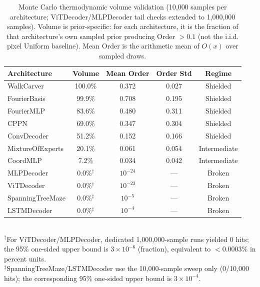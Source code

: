 \documentclass{article}
\begin{document}
\begin{table}[H]
\centering
\caption{Monte Carlo thermodynamic volume validation (10,000 samples per architecture; ViTDecoder/MLPDecoder tail checks extended to 1,000,000 samples). Volume is prior-specific: for each architecture, it is the fraction of that architecture's own sampled prior producing Order $> 0.1$ (not the i.i.d. pixel Uniform baseline). Mean Order is the arithmetic mean of $O(x)$ over sampled draws.}
\label{tab:monte_carlo_volume}
\begin{tabular}{lcccc}
\toprule
Architecture & Volume & Mean Order & Order Std & Regime \\
\midrule
WalkCarver & 100.0\% & 0.372 & 0.027 & Shielded \\
FourierBasis & 99.9\% & 0.708 & 0.195 & Shielded \\
FourierMLP & 83.6\% & 0.480 & 0.311 & Shielded \\
CPPN & 69.0\% & 0.347 & 0.304 & Shielded \\
ConvDecoder & 51.2\% & 0.152 & 0.166 & Shielded \\
\midrule
MixtureOfExperts & 20.1\% & 0.061 & 0.054 & Intermediate \\
CoordMLP & 7.2\% & 0.034 & 0.042 & Intermediate \\
\midrule
MLPDecoder & 0.0\%$^\dagger$ & $10^{-24}$ & --- & Broken \\
ViTDecoder & 0.0\%$^\dagger$ & $10^{-23}$ & --- & Broken \\
SpanningTreeMaze & 0.0\%$^\ddagger$ & $10^{-5}$ & --- & Broken \\
LSTMDecoder & 0.0\%$^\ddagger$ & $10^{-4}$ & --- & Broken \\
\bottomrule
\end{tabular}
\\[2pt]
{\footnotesize $^\dagger$For ViTDecoder/MLPDecoder, dedicated 1,000,000-sample runs yielded 0 hits; the 95\% one-sided upper bound is $3\times 10^{-6}$ (fraction), equivalent to $<0.0003\%$ in percent units.}
\\[-2pt]
{\footnotesize $^\ddagger$SpanningTreeMaze/LSTMDecoder use the 10,000-sample sweep only (0/10,000 hits); the corresponding 95\% one-sided upper bound is $3\times 10^{-4}$.}
\end{table}
\end{document}
